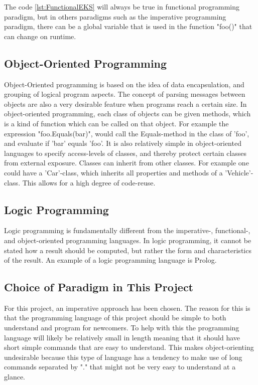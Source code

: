 The code \ref{lst:FunctionalEKS} will always be true in  functional programming paradigm, but in others paradigms such as the imperative programming paradigm, there can be a global variable that is used in the function "foo()" that can change on runtime.
\subsection{Object-Oriented Programming}
Object-Oriented programming is based on the idea of data encapsulation, and grouping of logical program aspects. The concept of parsing messages between objects are also a very desirable feature when programs reach a certain size. In object-oriented programming, each class of objects can be given methods, which is a kind of function which can be called on that object. For example the expression "foo.Equals(bar)", would call the Equals-method in the class of 'foo', and evaluate if 'bar' equals 'foo'. It is also relatively simple in object-oriented languages to specify access-levels of classes, and thereby protect certain classes from external exposure. Classes can inherit from other classes. For example one could have a 'Car'-class, which inherits all properties and methods of a 'Vehicle'-class. This allows for a high degree of code-reuse.

\subsection{Logic Programming}
Logic programming is fundamentally different from the imperative-, functional-, and object-oriented programming languages. In logic programming, it cannot be stated how a result should be computed, but rather the form and characteristics of the result. An example of a logic programming language is Prolog.

\subsection{Choice of Paradigm in This Project}
For this project, an imperative approach has been chosen. The reason for this is that the programming language of this project should be simple to both understand and program for newcomers. To help with this the programming language will likely be relatively small in length meaning that it should have short simple commands that are easy to understand. This makes object-orienting undesirable because this type of language has a tendency to make use of long commands separated by "." that might not be very easy to understand at a glance.